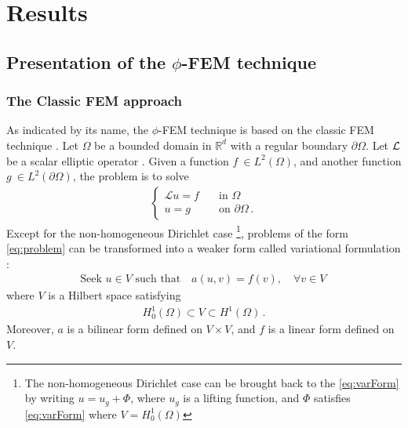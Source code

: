 

\chapter{Results} %

\label{Chapter3} %



\section{Presentation of the $\phi$-FEM technique}

\subsection{The Classic FEM approach}
As indicated by its name, the $\phi$-FEM technique is based on the classic FEM technique \parencite[p.111]{ern2013theory}. Let $\Omega$ be a bounded domain in $\mathbb{R}^d$ with a regular boundary $\partial\Omega$. Let $\cal{L}$ be a scalar elliptic operator \parencite{evans}. Given a function $f\ \in L^2(\Omega)$, and another function $g\ \in L^2(\partial \Omega)$, the problem is to solve
\begin{align}
    \begin{cases}
        \mathcal{L} u = f  \quad &\text{in } \Omega \\
        u = g & \text{on } \partial\Omega \,.
    \end{cases}
    \label{eq:problem}
\end{align}
Except for the non-homogeneous Dirichlet case \footnote{The non-homogeneous Dirichlet case can be brought back to the \ref{eq:varForm} by writing $u=u_g + \Phi$, where $u_g$ is a lifting function, and $\Phi$ satisfies \ref{eq:varForm} where $V=H^1_0(\Omega)$}, problems of the form \eqref{eq:problem} can be transformed into a weaker form called variational formulation :
\begin{align}
    \text{Seek } u \in V \text{ such that} \quad a(u,v)=f(v), \quad \forall v \in V \,
    \label{eq:varForm}
\end{align}
where $V$ is a Hilbert space satisfying
\begin{align*}
    H_0^1 (\Omega) \subset V \subset H^1 (\Omega) \,.
\end{align*}
Moreover, $a$ is a bilinear form defined on $V\times V$, and $f$ is a linear form defined on $V$.

